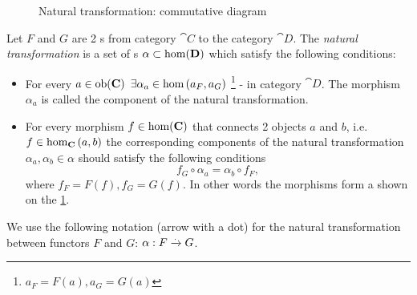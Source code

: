 \begin{definition}
\label{def:nt}

\begin{figure}
  \centering
  \caption{Natural transformation: commutative diagram}
  \label{fig:nt_def}
\end{figure}

Let $F$ and $G$ are 2 s from category $\cat{C}$
to the category $\cat{D}$. The \textit{natural transformation} is a
set of s $\alpha \subset \mathrm{hom}(\mathbf{D})$ which
satisfy the following conditions:
\begin{itemize}
\item For every  $a \in \mathrm{ob}(\mathbf{C})$ $\exists
\alpha_a \in \catmset{a_F}{a_G}$
\footnote{
$a_F = F(a), a_G = G(a)$
}
- 
in category $\cat{D}$. The morphism $\alpha_a$ is called the component of
the natural transformation.
\item For every morphism $f \in \mathrm{hom}(\mathbf{C})$ that connects 2 objects
  $a$ and $b$, i.e. $f \in \catmset[C]{a}{b}$ the corresponding components of
  the natural transformation $\alpha_a, \alpha_b \in \alpha$ should
  satisfy the following conditions
  \begin{equation}
    f_G \circ \alpha_a = \alpha_b \circ f_F,
    \label{eq:nt_definition}
  \end{equation}
  where $f_F = F(f), f_G = G(f)$.
  In other words the morphisms form a
   shown on the \cref{fig:nt_def}. 
\end{itemize}

We use the following notation (arrow with a dot) for the natural transformation between
functors $F$ and $G$: $\alpha: F \xrightarrow{.} G$. 
\end{definition}


